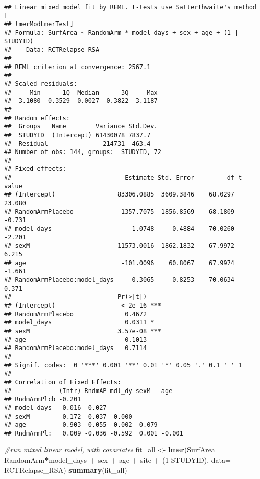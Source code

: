 \documentclass[]{article}
\newenvironment{Shaded}{\begin{snugshade}}{\end{snugshade}}
\newcommand{\KeywordTok}[1]{\textcolor[rgb]{0.13,0.29,0.53}{\textbf{#1}}}
\newcommand{\DataTypeTok}[1]{\textcolor[rgb]{0.13,0.29,0.53}{#1}}
\newcommand{\DecValTok}[1]{\textcolor[rgb]{0.00,0.00,0.81}{#1}}
\newcommand{\StringTok}[1]{\textcolor[rgb]{0.31,0.60,0.02}{#1}}
\newcommand{\CommentTok}[1]{\textcolor[rgb]{0.56,0.35,0.01}{\textit{#1}}}
\newcommand{\OperatorTok}[1]{\textcolor[rgb]{0.81,0.36,0.00}{\textbf{#1}}}
\newcommand{\NormalTok}[1]{#1}
\theoremstyle{definition}
\theoremstyle{definition}
\theoremstyle{definition}
\theoremstyle{remark}
\begin{document}
\begin{verbatim}
## Linear mixed model fit by REML. t-tests use Satterthwaite's method [
## lmerModLmerTest]
## Formula: SurfArea ~ RandomArm * model_days + sex + age + (1 | STUDYID)
##    Data: RCTRelapse_RSA
## 
## REML criterion at convergence: 2567.1
## 
## Scaled residuals: 
##     Min      1Q  Median      3Q     Max 
## -3.1080 -0.3529 -0.0027  0.3822  3.1187 
## 
## Random effects:
##  Groups   Name        Variance Std.Dev.
##  STUDYID  (Intercept) 61430078 7837.7  
##  Residual               214731  463.4  
## Number of obs: 144, groups:  STUDYID, 72
## 
## Fixed effects:
##                               Estimate Std. Error         df t value
## (Intercept)                 83306.0885  3609.3846    68.0297  23.080
## RandomArmPlacebo            -1357.7075  1856.8569    68.1809  -0.731
## model_days                     -1.0748     0.4884    70.0260  -2.201
## sexM                        11573.0016  1862.1832    67.9972   6.215
## age                          -101.0096    60.8067    67.9974  -1.661
## RandomArmPlacebo:model_days     0.3065     0.8253    70.0634   0.371
##                             Pr(>|t|)    
## (Intercept)                  < 2e-16 ***
## RandomArmPlacebo              0.4672    
## model_days                    0.0311 *  
## sexM                        3.57e-08 ***
## age                           0.1013    
## RandomArmPlacebo:model_days   0.7114    
## ---
## Signif. codes:  0 '***' 0.001 '**' 0.01 '*' 0.05 '.' 0.1 ' ' 1
## 
## Correlation of Fixed Effects:
##             (Intr) RndmAP mdl_dy sexM   age   
## RndmArmPlcb -0.201                            
## model_days  -0.016  0.027                     
## sexM        -0.172  0.037  0.000              
## age         -0.903 -0.055  0.002 -0.079       
## RndmArmPl:_  0.009 -0.036 -0.592  0.001 -0.001
\end{verbatim}

\begin{Shaded}
\begin{Highlighting}[]
\CommentTok{#run mixed linear model, with covariates}
\NormalTok{  fit_all <-}\StringTok{ }\KeywordTok{lmer}\NormalTok{(SurfArea }\OperatorTok{~}\StringTok{ }\NormalTok{RandomArm}\OperatorTok{*}\NormalTok{model_days }\OperatorTok{+}\StringTok{ }\NormalTok{sex }\OperatorTok{+}\StringTok{ }\NormalTok{age }\OperatorTok{+}\StringTok{ }\NormalTok{site }\OperatorTok{+}\StringTok{ }\NormalTok{(}\DecValTok{1}\OperatorTok{|}\NormalTok{STUDYID), }\DataTypeTok{data=}\NormalTok{ RCTRelapse_RSA)}
  \KeywordTok{summary}\NormalTok{(fit_all)}
\end{Highlighting}
\end{Shaded}
\end{document}
